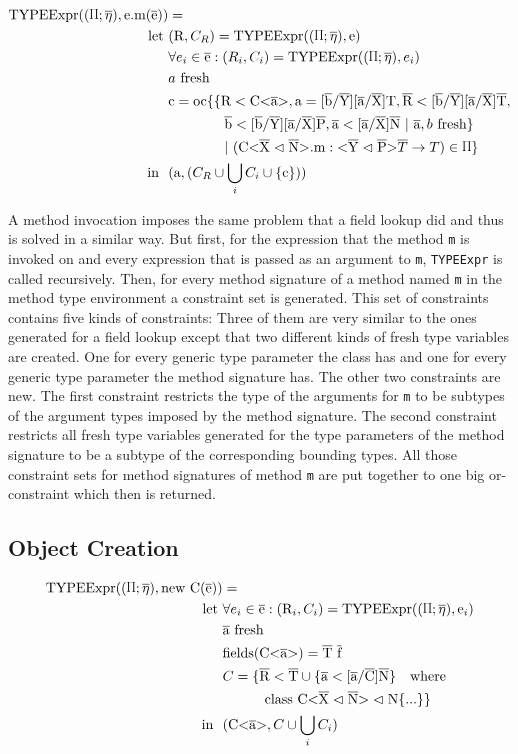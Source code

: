 \begin{align*}
    \texpr{\text{e.m}( \ot{e} )} &= \\
    \text{let} \ &( \text{R}, C_R ) = \texpr{\text{e}} \\
    &\forall{e_i} \in \ot{e} : ( R_i, C_i ) = \texpr{e_i} \\
    &\fresh{a} \\
    &\text{c} = \text{oc} \{ \{ \text{R} < \text{C<} \ot{a} \text{>}, \text{a} = \tsxsnd{b}{Y}{a}{X}{T}, \ot{R} < \tsxsnsd{b}{Y}{a}{X}{T}, \\
    & \quad \quad \quad \quad \ot{b} < \tsxsnsd{b}{Y}{a}{X}{P}, \ot{a} < \tsxsns{a}{X}{N} \ | \ \ot{a}, \fresh{b} \} \\
    & \quad \quad \quad \quad | \ ( \cm : \yp \oto{T} ) \in \sprod{0.7} \}\\
    \text{in} \ \ & (\text{a}, (C_R \cup \bigcup_{i} C_i \cup \{ \text{c} \} ))
\end{align*}

A method invocation imposes the same problem that a field lookup did and thus is solved in a similar way. But first, for the
expression that the method \verb|m| is invoked on and every expression that is passed as an argument to \verb|m|, \verb|TYPEExpr|
is called recursively. Then, for every method signature of a method named \verb|m| in the method type environment a constraint
set is generated. This set of constraints contains five kinds of constraints: Three of them are very similar to the ones generated for a
field lookup except that two different kinds of fresh type variables are created. One for every generic type parameter the class has and
one for every generic type parameter the method signature has. The other two constraints are new. The first constraint restricts the type of the arguments for \verb|m| to be subtypes of the
argument types imposed by the method signature. The second constraint restricts all fresh type variables generated for the type parameters
of the method signature to be a subtype of the corresponding bounding types. All those constraint sets for method signatures of method \verb|m| are put together to one big or-constraint which then is returned.

\subsection{Object Creation}

\begin{align*}
    \texpr{\text{new} \ \text{C}(\ot{e})} &=\\
    \text{let} \ & \forall{e_i} \in \ot{e} : (\text{R}_i, C_i) = \texpr{\text{e}_i}\\
    & \fresh{\ot{a}}\\
    & \text{fields}(\nvt{C}{a}) = \ot{T} \ \ot{f}\\
    & C = \{ \ot{R} < \ot{T} \cup \{ \ot{a} < \tsxsns{a}{C}{N} \} \quad \text{where} \\
    & \quad \quad \quad \classheader \{ ... \} \}\\
    \text{in} \ \ & ( \nvt{C}{a}, C \cup \bigcup_{i} C_i )
\end{align*}

